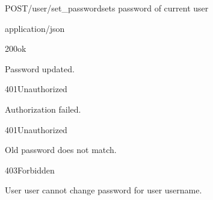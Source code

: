 \documentclass[12pt, etter]{article}
\begin{document}
\begin{apiRoute}{POST}{/user/set\_password}{sets password of current user}
    \begin{routeParameter}
    \end{routeParameter}
    \begin{routeResponse}{application/json}
        \begin{routeResponseItem}{200}{ok}
            \begin{routeResponseItemBody}
                Password updated.
            \end{routeResponseItemBody}
        \end{routeResponseItem}
        \begin{routeResponseItem}{401}{Unauthorized}
            \begin{routeResponseItemBody}
                Authorization failed.
            \end{routeResponseItemBody}
        \end{routeResponseItem}
        \begin{routeResponseItem}{401}{Unauthorized}
            \begin{routeResponseItemBody}
                Old password does not match.
            \end{routeResponseItemBody}
        \end{routeResponseItem}
        \begin{routeResponseItem}{403}{Forbidden}
            \begin{routeResponseItemBody}
                User {user} cannot change password for user {username}.
            \end{routeResponseItemBody}
        \end{routeResponseItem}
    \end{routeResponse}
\end{apiRoute}
\end{document}
